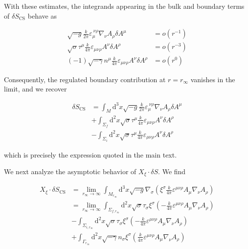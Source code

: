 With these estimates, the integrands appearing in the bulk and boundary terms of $\delta S_{\mathrm{CS}}$ behave as

\begin{align}
\sqrt{ -g }\frac{k}{2\pi}\varepsilon _{\mu}^{~\nu \rho}\nabla _{\nu}A_{\rho}\delta A^{\mu} & =o(r^{-1}) \\
\sqrt{ \sigma }\tau ^{\mu}\frac{k}{4\pi}\varepsilon _{\mu \nu \rho}A^{\nu}\delta A^{\rho} & =o(r^{-3}) \\
(-1)\sqrt{ -\gamma }n^{\mu}\frac{k}{4\pi}\varepsilon _{\mu \nu \rho}A^{\nu}\delta A^{\rho} & =o(r^{0})
\end{align}

Consequently, the regulated boundary contribution at $r=r_{\infty}$ vanishes in the limit, and we recover

\begin{align}
\delta S_{\mathrm{CS}} & =\int _{M}\mathrm{d}^{3}x\sqrt{ -g }\frac{k}{2\pi}\varepsilon _{\mu}^{~\nu \rho}\nabla _{\nu}A_{\rho}\delta A^{\mu} \\
 & +\int _{\Sigma _{f}}\mathrm{d}^{2}x\sqrt{ \sigma }\tau ^{\mu}\frac{k}{4\pi}\varepsilon _{\mu \nu \rho}A^{\nu}\delta A^{\rho} \\
 & -\int _{\Sigma _{i}}\mathrm{d}^{2}x\sqrt{ \sigma }\tau ^{\mu}\frac{k}{4\pi}\varepsilon _{\mu \nu \rho}A^{\nu}\delta A^{\rho}
\end{align}

which is precisely the expression quoted in the main text.

We next analyze the asymptotic behavior of $X_{\xi}\cdot \delta S$. We find

\begin{align}
X_{\xi}\cdot \delta S_{\mathrm{CS}} & =\lim_{ r_{\infty} \to \infty } \int _{M_{r_{\infty}}}\mathrm{d}^{3}x\sqrt{ -g }\nabla _{\sigma}\left(\xi ^{\sigma}\frac{k}{4\pi}\varepsilon ^{\mu \nu \rho}A_{\mu}\nabla _{\nu}A_{\rho}\right) \\
 & =\lim_{ r_{\infty} \to \infty } \int _{\Sigma _{f,r_{\infty}}}\mathrm{d}^{2}x\sqrt{ \sigma }\tau _{\sigma}\xi ^{\sigma}\left(-\frac{k}{4\pi}\varepsilon ^{\mu \nu \rho}A_{\mu}\nabla _{\nu}A_{\rho}\right) \\
 & -\int _{\Sigma _{i,r_{\infty}}}\mathrm{d}^{2}x\sqrt{ \sigma }\tau _{\sigma}\xi ^{\sigma}\left(-\frac{k}{4\pi}\varepsilon ^{\mu \nu \rho}A_{\mu}\nabla _{\nu}A_{\rho}\right) \\
 & +\int _{\Gamma _{r_{\infty}}}\mathrm{d}^{2}x\sqrt{ -\gamma }n_{\sigma}\xi ^{\sigma}\left(\frac{k}{4\pi}\varepsilon ^{\mu \nu \rho}A_{\mu}\nabla _{\nu}A_{\rho}\right)
\end{align}

